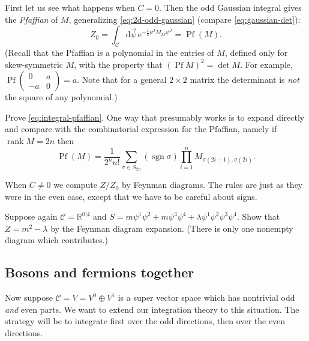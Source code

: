 \documentclass[12pt,letterpaper,reqno]{article}
\numberwithin{equation}{section}
\newcommand{\cC}{\ensuremath{\mathcal C}}
\newcommand{\R}{\ensuremath{\mathbb R}}
\newcommand{\half}{\ensuremath{\frac{1}{2}}}
\newcommand{\e}{{\mathrm e}}
\newcommand{\de}{\mathrm{d}}
\newcommand{\ti}[1]{\textit{#1}}
\DeclareMathOperator{\sgn}{sgn}
\DeclareMathOperator{\rank}{rank}
\DeclareMathOperator{\Pf}{Pf}
\newcommand{\fixme}[1]{{\color{orange}{[#1]}}}
\begin{document}
First let us see what happens when $C = 0$.
Then the odd Gaussian integral gives the \ti{Pfaffian} of $M$,
generalizing \eqref{eq:2d-odd-gaussian}
(compare \eqref{eq:gaussian-det}):
\begin{equation} \label{eq:integral-pfaffian}
  Z_0 = \int_\cC \de \vec\psi \, \e^{-\half \psi^I M_{IJ} \psi^J} = \Pf (M).
\end{equation}
(Recall that the Pfaffian is a polynomial in the entries of $M$, defined
only for skew-symmetric $M$, with the property that $(\Pf M)^2 = \det M$.
For example, $\Pf \begin{pmatrix} 0 & a \\ -a & 0 \end{pmatrix} = a$. Note that
for a general $2 \times 2$ matrix the determinant is \ti{not} the square of 
any polynomial.)
\begin{exercise} Prove \eqref{eq:integral-pfaffian}. One way that
presumably works is to expand directly and compare with the
combinatorial expression for the Pfaffian, namely if $\rank M = 2n$ then
\begin{equation}
  \Pf(M) = \frac{1}{2^n n!} \sum_{\sigma \in S_{2n}} (\sgn \sigma) \prod_{i=1}^n M_{\sigma(2i-1), \sigma(2i)}.
\end{equation}
\end{exercise}

When $C \neq 0$ we compute $Z / Z_0$ by Feynman diagrams.
The rules are just as they were in the even case, except that
we have to be careful about signs.
\fixme{...}


\begin{exercise} Suppose again $\cC = \R^{0 \vert 4}$ and $S = m \psi^1 \psi^2 + m \psi^3 \psi^4 + \lambda \psi^1 \psi^2 \psi^3 \psi^4$. Show that $Z = m^2 - \lambda$ by the Feynman diagram expansion. (There is only
one nonempty diagram which contributes.)
\end{exercise}


\subsection{Bosons and fermions together}

Now suppose $\cC = V = V^0 \oplus V^1$ is a super vector space 
which has nontrivial odd \ti{and} even parts. We want to extend
our integration theory to this situation. The strategy will be to 
integrate first over the odd directions, then over 
the even directions.
\end{document}
